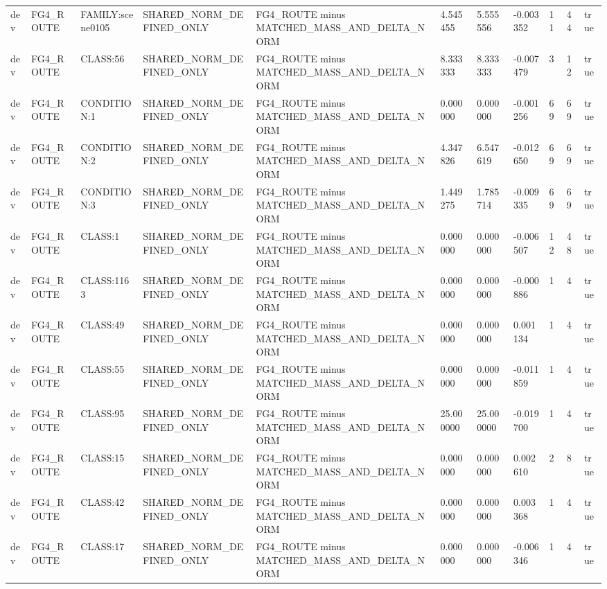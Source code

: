 \begin{tabular}{lllllllllll}
dev & FG4\_ROUTE & FAMILY:scene0105 & SHARED\_NORM\_DEFINED\_ONLY & FG4\_ROUTE minus MATCHED\_MASS\_AND\_DELTA\_NORM & 4.545455 & 5.555556 & -0.003352 & 11 & 44 & true \\
dev & FG4\_ROUTE & CLASS:56 & SHARED\_NORM\_DEFINED\_ONLY & FG4\_ROUTE minus MATCHED\_MASS\_AND\_DELTA\_NORM & 8.333333 & 8.333333 & -0.007479 & 3 & 12 & true \\
dev & FG4\_ROUTE & CONDITION:1 & SHARED\_NORM\_DEFINED\_ONLY & FG4\_ROUTE minus MATCHED\_MASS\_AND\_DELTA\_NORM & 0.000000 & 0.000000 & -0.001256 & 69 & 69 & true \\
dev & FG4\_ROUTE & CONDITION:2 & SHARED\_NORM\_DEFINED\_ONLY & FG4\_ROUTE minus MATCHED\_MASS\_AND\_DELTA\_NORM & 4.347826 & 6.547619 & -0.012650 & 69 & 69 & true \\
dev & FG4\_ROUTE & CONDITION:3 & SHARED\_NORM\_DEFINED\_ONLY & FG4\_ROUTE minus MATCHED\_MASS\_AND\_DELTA\_NORM & 1.449275 & 1.785714 & -0.009335 & 69 & 69 & true \\
dev & FG4\_ROUTE & CLASS:1 & SHARED\_NORM\_DEFINED\_ONLY & FG4\_ROUTE minus MATCHED\_MASS\_AND\_DELTA\_NORM & 0.000000 & 0.000000 & -0.006507 & 12 & 48 & true \\
dev & FG4\_ROUTE & CLASS:1163 & SHARED\_NORM\_DEFINED\_ONLY & FG4\_ROUTE minus MATCHED\_MASS\_AND\_DELTA\_NORM & 0.000000 & 0.000000 & -0.000886 & 1 & 4 & true \\
dev & FG4\_ROUTE & CLASS:49 & SHARED\_NORM\_DEFINED\_ONLY & FG4\_ROUTE minus MATCHED\_MASS\_AND\_DELTA\_NORM & 0.000000 & 0.000000 & 0.001134 & 1 & 4 & true \\
dev & FG4\_ROUTE & CLASS:55 & SHARED\_NORM\_DEFINED\_ONLY & FG4\_ROUTE minus MATCHED\_MASS\_AND\_DELTA\_NORM & 0.000000 & 0.000000 & -0.011859 & 1 & 4 & true \\
dev & FG4\_ROUTE & CLASS:95 & SHARED\_NORM\_DEFINED\_ONLY & FG4\_ROUTE minus MATCHED\_MASS\_AND\_DELTA\_NORM & 25.000000 & 25.000000 & -0.019700 & 1 & 4 & true \\
dev & FG4\_ROUTE & CLASS:15 & SHARED\_NORM\_DEFINED\_ONLY & FG4\_ROUTE minus MATCHED\_MASS\_AND\_DELTA\_NORM & 0.000000 & 0.000000 & 0.002610 & 2 & 8 & true \\
dev & FG4\_ROUTE & CLASS:42 & SHARED\_NORM\_DEFINED\_ONLY & FG4\_ROUTE minus MATCHED\_MASS\_AND\_DELTA\_NORM & 0.000000 & 0.000000 & 0.003368 & 1 & 4 & true \\
dev & FG4\_ROUTE & CLASS:17 & SHARED\_NORM\_DEFINED\_ONLY & FG4\_ROUTE minus MATCHED\_MASS\_AND\_DELTA\_NORM & 0.000000 & 0.000000 & -0.006346 & 1 & 4 & true \\

\end{tabular}
